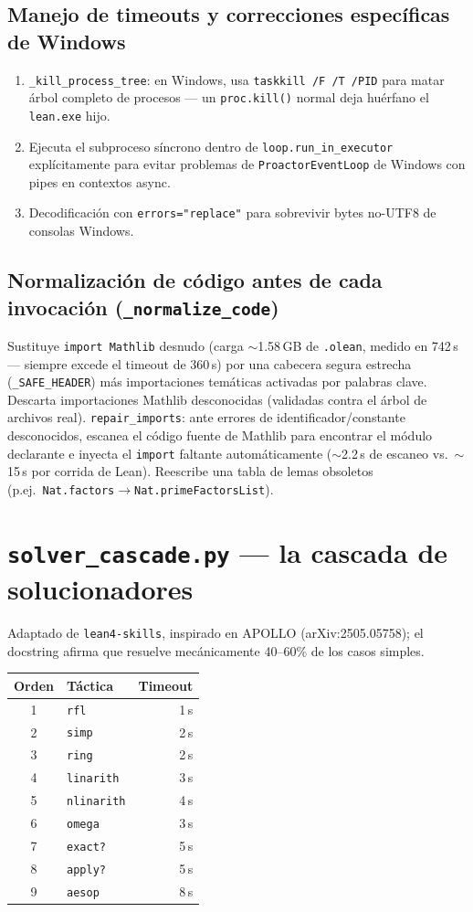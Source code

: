 \documentclass[11pt,a4paper]{report}
\newcommand{\code}[1]{\texttt{#1}}
\begin{document}
\subsection{Manejo de timeouts y correcciones espec\'ificas de Windows}
\begin{enumerate}
  \item \code{\_kill_process_tree}: en Windows, usa \code{taskkill /F /T /PID} para matar \'arbol completo de procesos --- un \code{proc.kill()} normal deja hu\'erfano el \code{lean.exe} hijo.
  \item Ejecuta el subproceso s\'incrono dentro de \code{loop.run_in_executor} expl\'icitamente para evitar problemas de \code{ProactorEventLoop} de Windows con pipes en contextos async.
  \item Decodificaci\'on con \code{errors="replace"} para sobrevivir bytes no-UTF8 de consolas Windows.
\end{enumerate}

\subsection{Normalizaci\'on de c\'odigo antes de cada invocaci\'on (\code{\_normalize_code})}
Sustituye \code{import Mathlib} desnudo (carga $\sim$1.58\,GB de \code{.olean}, medido en 742\,s --- siempre excede el timeout de 360\,s) por una cabecera segura estrecha (\code{\_SAFE\_HEADER}) m\'as importaciones tem\'aticas activadas por palabras clave. Descarta importaciones Mathlib desconocidas (validadas contra el \'arbol de archivos real). \code{repair\_imports}: ante errores de identificador/constante desconocidos, escanea el c\'odigo fuente de Mathlib para encontrar el m\'odulo declarante e inyecta el \code{import} faltante autom\'aticamente ($\sim$2.2\,s de escaneo vs.\ $\sim$15\,s por corrida de Lean). Reescribe una tabla de lemas obsoletos (p.ej.\ \code{Nat.factors}$\to$\code{Nat.primeFactorsList}).

\section{\code{solver_cascade.py} --- la cascada de solucionadores}

Adaptado de \code{lean4-skills}, inspirado en APOLLO (arXiv:2505.05758); el docstring afirma que resuelve mec\'anicamente 40--60\% de los casos simples.

\begin{longtable}{@{}clr@{}}
\toprule
\textbf{Orden} & \textbf{T\'actica} & \textbf{Timeout} \\
\midrule
\endhead
1 & \code{rfl} & 1\,s \\
2 & \code{simp} & 2\,s \\
3 & \code{ring} & 2\,s \\
4 & \code{linarith} & 3\,s \\
5 & \code{nlinarith} & 4\,s \\
6 & \code{omega} & 3\,s \\
7 & \code{exact?} & 5\,s \\
8 & \code{apply?} & 5\,s \\
9 & \code{aesop} & 8\,s \\
\bottomrule
\end{longtable}
\end{document}
